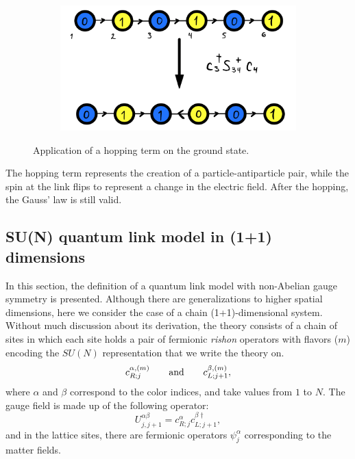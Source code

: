 \documentclass[a4paper]{report}
\begin{document}
\begin{spacing}{1.1}
\begin{figure}[h!]
\centering
\begin{subfigure}{0.4\textwidth}
\includegraphics[width=\linewidth]{GndState.png} %
\end{subfigure}
\caption{Application of a hopping term on the ground state.\label{fig:gnd}}
\end{figure}
The hopping term represents the creation of a particle-antiparticle pair, while the spin at the link flips to represent a change in the electric field. After the hopping, the Gauss' law is still valid.

\subsection{SU(N) quantum link model in (1+1) dimensions}

In this section, the definition of a quantum link model with non-Abelian gauge symmetry is presented. Although there are generalizations to higher spatial dimensions, here we consider the case of a chain (1+1)-dimensional system. Without much discussion about its derivation, the theory consists of a chain of sites in which each site holds a pair of fermionic \textit{rishon} operators with flavors ($m$) encoding the $SU(N)$ representation that we write the theory on.
\begin{equation}
    c^{\alpha,(m)}_{R;j} \qquad \textnormal{and} \qquad c^{\beta,(m)}_{L;j+1},
\end{equation}
where $\alpha$ and $\beta$ correspond to the color indices, and take values from $1$ to $N$. The gauge field is made up of the following operator:
\begin{equation}
    U^{\alpha \beta}_{j,j+1} = c^\alpha_{R;j} c^{\beta\dagger}_{L;j+1},
\end{equation}
and in the lattice sites, there are fermionic operators $\psi^\alpha_j$ corresponding to the matter fields.


\end{spacing}
\end{document}
